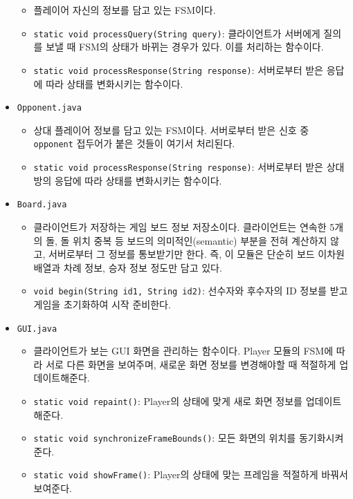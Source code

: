\documentclass[a4paper, 10pt]{article}
\begin{document}
\begin{itemize}
\begin{itemize}
    \item[] 플레이어 자신의 정보를 담고 있는 FSM이다.
    \item \texttt{static void processQuery(String query)}: 클라이언트가 서버에게 질의를 보낼 때 FSM의 상태가 바뀌는 경우가 있다. 이를 처리하는 함수이다.
    \item \texttt{static void processResponse(String response)}: 서버로부터 받은 응답에 따라 상태를 변화시키는 함수이다.
  \end{itemize}
  \item \texttt{Opponent.java}
  \begin{itemize}
    \item[] 상대 플레이어 정보를 담고 있는 FSM이다. 서버로부터 받은 신호 중 \texttt{opponent} 접두어가 붙은 것들이 여기서 처리된다.
    \item \texttt{static void processResponse(String response)}: 서버로부터 받은 상대방의 응답에 따라 상태를 변화시키는 함수이다.
  \end{itemize}
  \item \texttt{Board.java}
  \begin{itemize}
    \item[] 클라이언트가 저장하는 게임 보드 정보 저장소이다. 클라이언트는 연속한 5개의 돌, 돌 위치 중복 등
    보드의 의미적인(semantic) 부분을 전혀 계산하지 않고, 서버로부터 그 정보를 통보받기만 한다.
    즉, 이 모듈은 단순히 보드 이차원 배열과 차례 정보, 승자 정보 정도만 담고 있다.
    \item \texttt{void begin(String id1, String id2)}: 선수자와 후수자의 ID 정보를 받고 게임을 초기화하여 시작 준비한다.
  \end{itemize}
  \item \texttt{GUI.java}
  \begin{itemize}
    \item[] 클라이언트가 보는 GUI 화면을 관리하는 함수이다. Player 모듈의 FSM에 따라 서로 다른 화면을 보여주며,
    새로운 화면 정보를 변경해야할 때 적절하게 업데이트해준다.
    \item \texttt{static void repaint()}: Player의 상태에 맞게 새로 화면 정보를 업데이트해준다.
    \item \texttt{static void synchronizeFrameBounds()}: 모든 화면의 위치를 동기화시켜준다.
    \item \texttt{static void showFrame()}: Player의 상태에 맞는 프레임을 적절하게 바꿔서 보여준다.
  \end{itemize}
\end{itemize}
\end{document}

